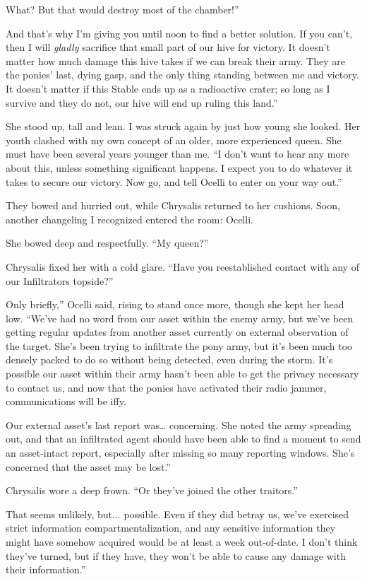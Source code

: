 \leavevmode{}What? But that would destroy most of the chamber!”

\leavevmode{}And that’s why I’m giving you until noon to find a better solution. If you can’t, then I will \textit{gladly} sacrifice that small part of our hive for victory. It doesn’t matter how much damage this hive takes if we can break their army. They are the ponies’ last, dying gasp, and the only thing standing between me and victory. It doesn’t matter if this Stable ends up as a radioactive crater; so long as I survive and they do not, our hive will end up ruling this land.”

She stood up, tall and lean. I was struck again by just how young she looked. Her youth clashed with my own concept of an older, more experienced queen. She must have been several years younger than me. “I don’t want to hear any more about this, unless something significant happens. I expect you to do whatever it takes to secure our victory. Now go, and tell Ocelli to enter on your way out.”

They bowed and hurried out, while Chrysalis returned to her cushions. Soon, another changeling I recognized entered the room: Ocelli.

She bowed deep and respectfully. “My queen?”

Chrysalis fixed her with a cold glare. “Have you reestablished contact with any of our Infiltrators topside?”

\leavevmode{}Only briefly,” Ocelli said, rising to stand once more, though she kept her head low. “We’ve had no word from our asset within the enemy army, but we’ve been getting regular updates from another asset currently on external observation of the target. She’s been trying to infiltrate the pony army, but it’s been much too densely packed to do so without being detected, even during the storm. It’s possible our asset within their army hasn’t been able to get the privacy necessary to contact us, and now that the ponies have activated their radio jammer, communications will be iffy.

\leavevmode{}Our external asset’s last report was… concerning. She noted the army spreading out, and that an infiltrated agent should have been able to find a moment to send an asset-intact report, especially after missing so many reporting windows. She’s concerned that the asset may be lost.”

Chrysalis wore a deep frown. “Or they’ve joined the other traitors.”

\leavevmode{}That seems unlikely, but... possible. Even if they did betray us, we’ve exercised strict information compartmentalization, and any sensitive information they might have somehow acquired would be at least a week out-of-date. I don’t think they’ve turned, but if they have, they won’t be able to cause any damage with their information.”

